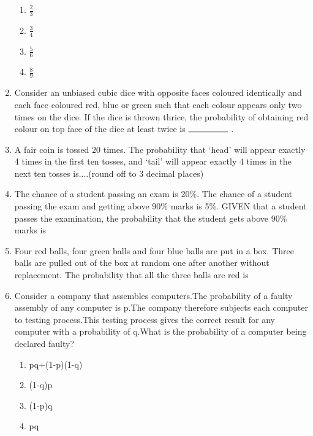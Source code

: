 \documentclass[journal,12pt,twocolumn]{IEEEtran}
\begin{document}
\begin{enumerate}
    \begin{enumerate}
        \item $\frac{2}{3}$
        \item $\frac{3}{4}$
        \item $\frac{5}{6}$
        \item $\frac{8}{9}$
    \end{enumerate}
%
\solution

%
\item Consider an unbiased cubic dice with opposite faces coloured identically and each face coloured red, blue or green such that each colour appears only two times on the dice. If the dice is thrown thrice, the probability of obtaining red colour on top face of the dice at least twice is $\rule{1.6cm}{0.15mm}$ .
%
\solution

%
\item A fair coin is tossed 20
 times. The probability that ‘head’ will appear exactly 4
 times in the first ten tosses, and ‘tail’ will appear exactly 4
 times in the next ten tosses is....(round off to 3
 decimal places)
%
\\
\solution

%
\item  The chance of a student passing an exam is 20\%. The chance of a student passing the exam and getting above 90\% marks is 5\%. GIVEN that a student passes the examination, the probability that the student gets above 90\% marks is
%
\\
\solution

%
\item Four red balls, four green balls and four blue balls are put in a box. Three balls are pulled out of the box at random one after another without replacement. The probability that all the three balls are red is  
%
\\
\solution

%
\item Consider a company that assembles computers.The probability of a faulty assembly of any computer is p.The company therefore subjects each computer to testing process.This testing process gives the correct result for any computer with a probability of q.What is the probability of a computer being declared faulty?
\begin{enumerate}
\item pq+(1-p)(1-q)
\item (1-q)p
\item (1-p)q
\item pq
\end{enumerate}

\end{enumerate}
\end{document}
